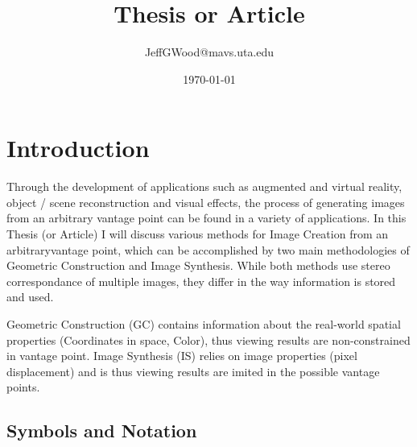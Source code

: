 \documentclass[12pt]{report}
\title{Thesis or Article}
\author{JeffGWood@mavs.uta.edu}
\date{\today}
\begin{document}
\Huge
\maketitle
\large
\newpage
\tableofcontents
\newpage


\chapter{Introduction}
\par Through the development of applications such as augmented and virtual reality, object / scene reconstruction and visual effects, the process of generating images from an arbitrary vantage point can be found in a variety of applications. In this Thesis (or Article) I will discuss various methods for Image Creation from an arbitraryvantage point, which can be accomplished by two main methodologies of Geometric Construction and Image Synthesis. While both methods use stereo correspondance of multiple images, they differ in the way information is stored and used.
\par Geometric Construction (GC) contains information about the real-world spatial properties (Coordinates in space, Color), thus viewing results are non-constrained in vantage point. Image Synthesis (IS) relies on image properties (pixel displacement) and is thus viewing results are imited in the possible vantage points.
\newpage

\section*{Symbols and Notation}
\end{document}
